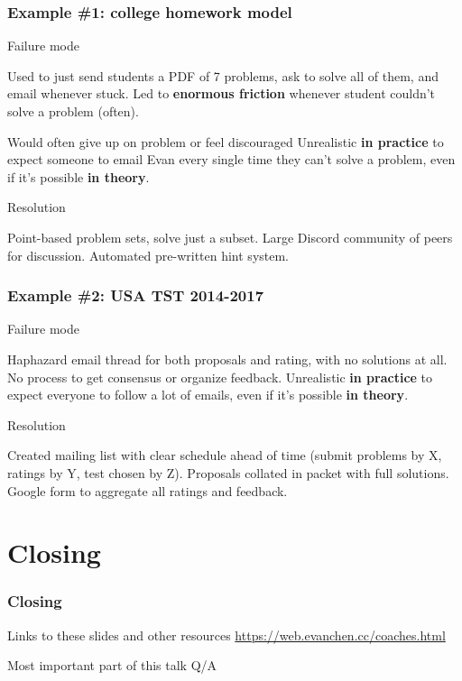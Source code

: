 \documentclass[11pt]{beamer}
\begin{document}
\begin{frame}
  \frametitle{Example \#1: college homework model}
  \begin{alertblock}{Failure mode}
    \begin{itemize}
      \ii Used to just send students a PDF of 7 problems,
      ask to solve all of them, and email whenever stuck.
      \ii Led to \textbf{enormous friction}
      whenever student couldn't solve a problem (often).
      \begin{itemize}
        \ii Would often give up on problem or feel discouraged
        \ii Unrealistic \textbf{in practice}
        to expect someone to email Evan every single time
        they can't solve a problem,
        even if it's possible \textbf{in theory}.
      \end{itemize}
    \end{itemize}
  \end{alertblock}
  \pause
  \begin{exampleblock}{Resolution}
    \begin{itemize}
      \ii Point-based problem sets, solve just a subset.
      \ii Large Discord community of peers for discussion.
      \ii Automated pre-written hint system.
    \end{itemize}
  \end{exampleblock}
\end{frame}

\begin{frame}
  \frametitle{Example \#2: USA TST 2014-2017}
  \begin{alertblock}{Failure mode}
    \begin{itemize}
      \ii Haphazard email thread for both proposals and rating,
      with no solutions at all.
      \ii No process to get consensus or organize feedback.
      \ii Unrealistic \textbf{in practice} to expect
      everyone to follow a lot of emails,
      even if it's possible \textbf{in theory}.
    \end{itemize}
  \end{alertblock}
  \pause
  \begin{exampleblock}{Resolution}
    \begin{itemize}
      \ii Created mailing list with clear schedule ahead of time
      (submit problems by X, ratings by Y, test chosen by Z).
      \ii Proposals collated in packet with full solutions.
      \ii Google form to aggregate all ratings and feedback.
    \end{itemize}
  \end{exampleblock}
\end{frame}

\section{Closing}
\begin{frame}
  \frametitle{Closing}
  \begin{block}{Links to these slides and other resources}
    \url{https://web.evanchen.cc/coaches.html}
  \end{block}

  \bigskip
  \pause

  \begin{block}{Most important part of this talk}
    \LARGE\centering Q/A
  \end{block}
\end{frame}
\end{document}
